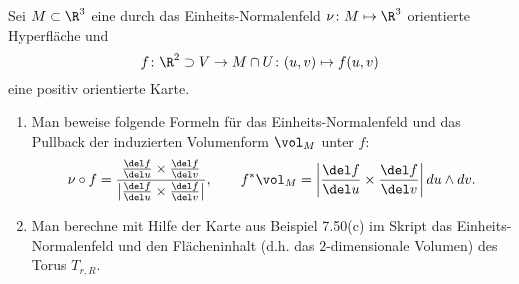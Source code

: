            \begin{prob}
%
Sei $M \subset \R^3$ eine durch das Einheits-Normalenfeld $\nu \colon M \mapsto \R^3$ orientierte Hyperfl\"ache und
$$
f \colon \R^2 \supset V \to M\cap U \colon (u,v) \mapsto f(u,v)
$$
eine positiv orientierte Karte. 
\begin{enumerate}[label = (\alph*)]
	\item Man beweise folgende Formeln f\"ur das Einheits-Normalenfeld und das Pullback der induzierten Volumenform $\vol_M$ unter $f$: 
	$$
	\nu \circ f = \frac{\frac{\del f}{\del u}\times\frac{\del f}{\del v}}{\bigl|\frac{\del f}{\del u}\times\frac{\del f}{\del v}\bigr|}, \qquad
	f^* \vol_M = \left| \frac{\del f}{\del u}\times\frac{\del f}{\del v} \right| du \wedge dv. 
	$$
	\item Man berechne mit Hilfe der Karte aus Beispiel 7.50(c) im Skript das Einheits-Normalenfeld und den Fl\"acheninhalt (d.h. das $2$-dimensionale Volumen) des Torus $T_{r,R}$. 
\end{enumerate}

\vspace{2mm}
            \end{prob}
